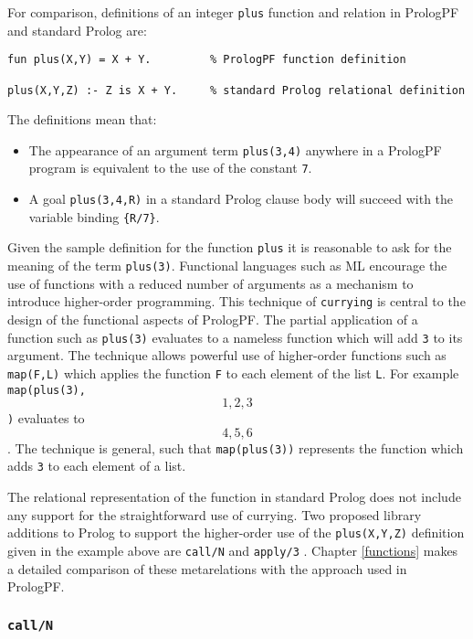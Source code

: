 For comparison, definitions of an integer \texttt{plus} function and relation in
PrologPF and standard Prolog are:
\begin{verbatim}
fun plus(X,Y) = X + Y.         % PrologPF function definition

plus(X,Y,Z) :- Z is X + Y.     % standard Prolog relational definition
\end{verbatim}
The definitions mean that:
\begin{itemize}
\item{The appearance of an argument term \texttt{plus(3,4)} anywhere in a 
  PrologPF program is equivalent to the use of the constant \texttt{7}.}
\item{A goal \texttt{plus(3,4,R)} in a standard Prolog clause body will
  succeed with the variable binding \texttt{\{R/7\}}.}
\end{itemize}
Given the sample definition for the function \texttt{plus} it is reasonable to
ask for the meaning of the term \texttt{plus(3)}.  Functional languages such
as ML \cite{MTH90, Pau91} encourage the use of functions with a reduced number of
arguments as a mechanism to introduce higher-order programming.  This technique
of \texttt{currying} \cite{Cur30,Sch24} is central to the design of the functional
aspects of PrologPF.  The partial application of a function such as \texttt{plus(3)}
evaluates to a nameless function which will add \texttt{3} to its argument.  The
technique allows powerful use of higher-order functions such as \texttt{map(F,L)}
which applies the function \texttt{F} to each element of the list \texttt{L}. For
example \texttt{map(plus(3),\[1,2,3\])} evaluates to \texttt{\[4,5,6\]}.
The technique is general, such that \texttt{map(plus(3))} represents the function
which adds \texttt{3} to each element of a list.

The relational representation of the function in standard Prolog does not include any
support for the straightforward use of currying.  Two proposed
library additions to Prolog to
support the higher-order use of the \texttt{plus(X,Y,Z)} definition given in the example
above are \texttt{call/N} and \texttt{apply/3} \cite{Nai96}.  Chapter \ref{functions}
makes a detailed comparison of these metarelations with the approach used in PrologPF.

\subsubsection{\texttt{call/N}}


